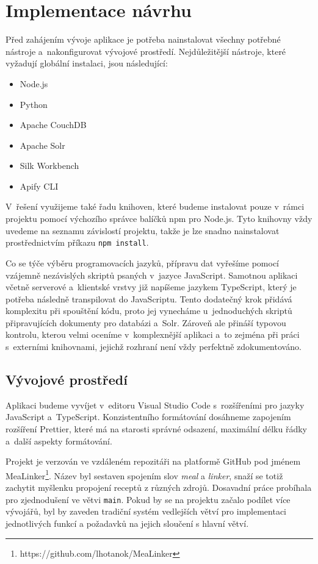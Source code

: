 
\chapter{Implementace návrhu}

Před zahájením vývoje aplikace je potřeba nainstalovat všechny potřebné nástroje a~nakonfigurovat vývojové prostředí. Nejdůležitější nástroje, které vyžadují globální instalaci, jsou následující:

\begin{itemize}
    \item Node.js
    \item Python
    \item Apache CouchDB
    \item Apache Solr
    \item Silk Workbench
    \item Apify CLI
\end{itemize}

V~řešení využijeme také řadu knihoven, které budeme instalovat pouze v~rámci projektu pomocí výchozího správce balíčků npm pro Node.js. Tyto knihovny vždy uvedeme na seznamu závislostí projektu, takže je lze snadno nainstalovat prostřednictvím příkazu \texttt{npm install}.

Co se týče výběru programovacích jazyků, přípravu dat vyřešíme pomocí vzájemně nezávislých skriptů psaných v~jazyce JavaScript. Samotnou aplikaci včetně serverové a~klientské vrstvy již napíšeme jazykem TypeScript, který je potřeba následně transpilovat do JavaScriptu. Tento dodatečný krok přidává komplexitu při spouštění kódu, proto jej vynecháme u~jednoduchých skriptů připravujících dokumenty pro databázi a~Solr. Zároveň ale přináší typovou kontrolu, kterou velmi oceníme v~komplexnější aplikaci a~to zejména při práci s~externími knihovnami, jejichž rozhraní není vždy perfektně zdokumentováno.

\section{Vývojové prostředí}

Aplikaci budeme vyvíjet v~editoru Visual Studio Code s~rozšířeními pro jazyky JavaScript a~TypeScript. Konzistentního formátování dosáhneme zapojením rozšíření Prettier, které má na starosti správné odsazení, maximální délku řádky a~další aspekty formátování.

Projekt je verzován ve vzdáleném repozitáři na platformě GitHub pod jménem MeaLinker\footnote{https://github.com/lhotanok/MeaLinker}. Název byl sestaven spojením slov \emph{meal} a \emph{linker}, snaží se totiž zachytit myšlenku propojení receptů z různých zdrojů. Dosavadní práce probíhala pro zjednodušení ve větvi \texttt{main}. Pokud by se na projektu začalo podílet více vývojářů, byl by zaveden tradiční systém vedlejších větví pro implementaci jednotlivých funkcí a požadavků na jejich sloučení s hlavní větví.

